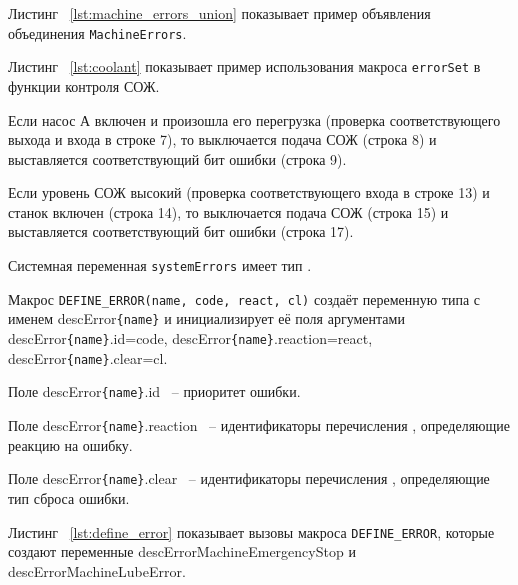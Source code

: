 Листинг ~\ref{lst:machine_errors_union} показывает пример объявления объединения \texttt{MachineErrors}. \killoverfullbefore \BL


\BL

Листинг ~\ref{lst:coolant} показывает пример использования макроса \texttt{errorSet} в функции контроля СОЖ. 

Если насос А включен и произошла его перегрузка (проверка соответствующего выхода и входа в строке 7), то выключается подача СОЖ (строка 8) и выставляется соответствующий бит ошибки (строка 9).\killoverfullbefore

Если уровень СОЖ высокий (проверка соответствующего входа в строке 13) и станок включен (строка 14), то выключается подача СОЖ (строка 15) и выставляется соответствующий бит ошибки (строка 17).\killoverfullbefore

Системная переменная \texttt{systemErrors} имеет тип . \killoverfullbefore \BL


Макрос \texttt{DEFINE\_ERROR(name, code, react, cl)} создаёт переменную типа  с именем descError\texttt{\{name\}} и инициализирует её поля аргументами descError\texttt{\{name\}}.id=code, descError\texttt{\{name\}}.reaction=react, descError\texttt{\{name\}}.clear=cl. \killoverfullbefore

Поле descError\texttt{\{name\}}.id ~-- приоритет ошибки. 

Поле descError\texttt{\{name\}}.reaction ~-- идентификаторы перечисления , определяющие реакцию на ошибку. 

Поле descError\texttt{\{name\}}.clear ~-- идентификаторы перечисления , определяющие тип сброса ошибки.

Листинг ~\ref{lst:define_error} показывает вызовы макроса \texttt{DEFINE\_ERROR}, которые создают переменные descErrorMachineEmergencyStop и descErrorMachineLubeError. \killoverfullbefore \BL


